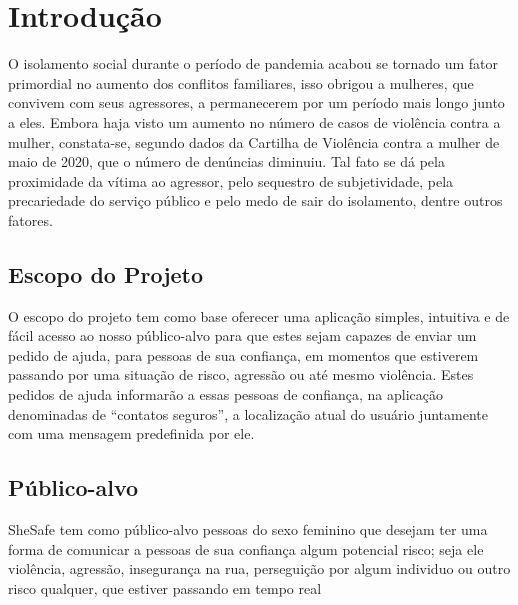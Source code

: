 \chapter{Introdução}\label{sec:introducao}
O isolamento social durante o período de pandemia acabou se tornado um fator primordial no aumento dos conflitos familiares, isso obrigou a mulheres, que convivem com seus agressores, a permanecerem por um período mais longo junto a eles. Embora haja visto um aumento no número de casos de violência contra a mulher, constata-se, segundo dados da Cartilha de Violência contra a mulher de maio de 2020, que o número de denúncias diminuiu. Tal fato se dá pela proximidade da vítima ao agressor, pelo sequestro de subjetividade, pela precariedade do serviço público e pelo medo de sair do isolamento, dentre outros fatores.

\section{Escopo do Projeto}
O escopo do projeto tem como base oferecer uma aplicação simples, intuitiva e de fácil acesso ao nosso público-alvo para que estes sejam capazes de enviar um pedido de ajuda, para pessoas de sua confiança, em momentos que estiverem passando por uma situação de risco, agressão ou até mesmo violência. Estes pedidos de ajuda informarão a essas pessoas de confiança, na aplicação denominadas de “contatos seguros”, a localização atual do usuário juntamente com uma mensagem predefinida por ele.

\section{Público-alvo}
SheSafe tem como público-alvo pessoas do sexo feminino que desejam ter uma forma de comunicar a pessoas de sua confiança algum potencial risco; seja ele violência, agressão, insegurança na rua, perseguição por algum individuo ou outro risco qualquer, que estiver passando em tempo real

